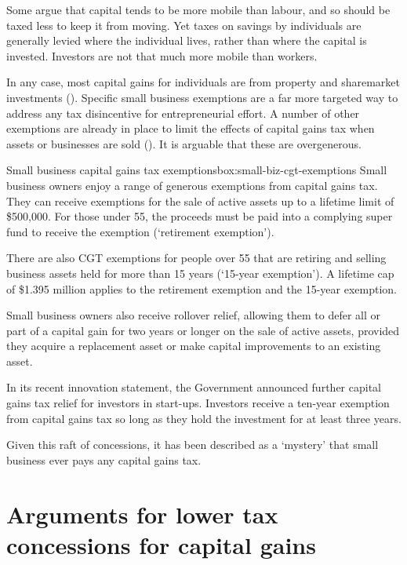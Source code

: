 Some argue that capital tends to be more mobile than labour, and so should be taxed less to keep it from moving. Yet taxes on savings by individuals are generally levied where the individual lives, rather than where the capital is invested. Investors are not that much more mobile than workers.

In any case, most capital gains for individuals are from property and sharemarket investments (). Specific small business exemptions are a far more targeted way to address any tax disincentive for entrepreneurial effort. A number of other exemptions are already in place to limit the effects of capital gains tax when assets or businesses are sold (). It is arguable that these are overgenerous. 

\begin{smallbox}{Small business capital gains tax exemptions}{box:small-biz-cgt-exemptions}
Small business owners enjoy a range of generous exemptions from capital gains tax.  
They can receive exemptions for the sale of active assets up to a lifetime limit of \$500,000. For those under 55, the proceeds must be paid into a complying super fund to receive the exemption (‘retirement exemption’). 

There are also CGT exemptions for people over 55 that are retiring and selling business assets held for more than 15 years (‘15\nobreakdash-year exemption’). A lifetime cap of \$1.395 million applies to the retirement exemption and the 15-year exemption. 

Small business owners also receive rollover relief, allowing them to defer all or part of a capital gain for two years or longer on the sale of active assets, provided they acquire a replacement asset or make capital improvements to an existing asset.

In its recent innovation statement, the Government announced further capital gains tax relief for investors in start-ups. Investors receive a ten-year exemption from capital gains tax so long as they hold the investment for at least three years.

Given this raft of concessions, it has been described as a ‘mystery’ that small business ever pays any capital gains tax.

\end{smallbox}


\section{Arguments for lower tax concessions for capital gains}\label{subsec:arguments-lower-tax-concessions-for-capital-gains}

